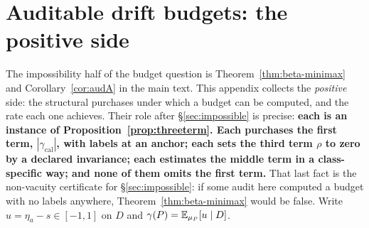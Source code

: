 
\section{Auditable drift budgets: the positive side}\label{app:audit-short}\label{app:auditable}
The impossibility half of the budget question is Theorem~\ref{thm:beta-minimax} and
Corollary~\ref{cor:audA} in the main text. This appendix collects the \emph{positive} side: the
structural purchases under which a budget can be computed, and the rate each one achieves. Their
role after \S\ref{sec:impossible} is precise: \textbf{each is an instance of
Proposition~\ref{prop:threeterm}. Each purchases the first term, $|\gamma_{\mathrm{cal}}|$, with
labels at an anchor; each sets the third term $\rho$ to zero by a declared invariance; each
estimates the middle term in a class-specific way; and none of them omits the first term.} That last
fact is the non-vacuity certificate for \S\ref{sec:impossible}: if some audit here computed a budget
with no labels anywhere, Theorem~\ref{thm:beta-minimax} would be false. Write $u=\eta_a-s\in[-1,1]$ on $D$ and $\gamma(P)=\mathbb{E}_{\mu_P}[u\mid D]$.

